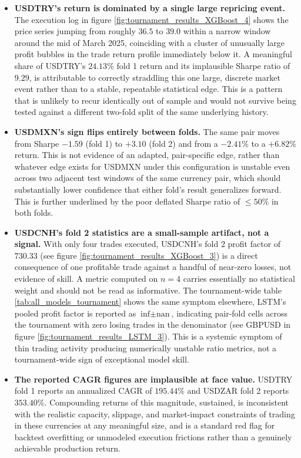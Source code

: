 \documentclass[12pt, a4paper]{article}
\begin{document}
\begin{itemize}
\item \textbf{USDTRY's return is dominated by a single large repricing event.} The execution log in figure \ref{fig:tournament_results_XGBoost_4} shows the price 
series jumping from roughly $36.5$ to $39.0$ within a narrow window around the mid of March 2025, coinciding with a cluster of unusually large profit bubbles in the trade return 
profile immediately below it. A meaningful share of USDTRY's $24.13\%$ fold 1 return and its implausible Sharpe ratio of $9.29$, is attributable to correctly 
straddling this one large, discrete market event rather than to a stable, repeatable statistical edge. This is a pattern that is unlikely to recur identically out of 
sample and would not survive being tested against a different two-fold split of the same underlying history.

\item \textbf{USDMXN's sign flips entirely between folds.} The same pair moves from Sharpe $-1.59$ (fold 1) to $+3.10$ (fold 2) and from a $-2.41\%$ to a $+6.82\%$ return. This 
is not evidence of an adapted, pair-specific edge, rather than whatever edge exists for USDMXN under this configuration is unstable even across two adjacent test 
windows of the same currency pair, which should substantially lower confidence that either fold's result generalizes forward. This is further underlined by the poor deflated Sharpe 
ratio of $\leq 50\%$ in both folds.

\item \textbf{USDCNH's fold 2 statistics are a small-sample artifact, not a signal.} With only four trades executed, USDCNH's fold 2 profit factor of $730.33$ (see figure 
\ref{fig:tournament_results_XGBoost_3}) is a direct consequence of one profitable trade against a handful of near-zero losses, not evidence of skill. A metric computed on $n=4$ 
carries essentially no statistical weight and should not be read as informative. The tournament-wide table \ref{tab:all_models_tournament} shows the same symptom elsewhere, LSTM's 
pooled profit factor is reported as $\text{inf} \pm \text{nan}$, indicating pair-fold cells across the tournament with zero losing trades in the denominator (see GBPUSD in figure 
\ref{fig:tournament_results_LSTM_3}). This is a systemic symptom of thin trading activity producing numerically unstable ratio metrics, not a tournament-wide sign of exceptional 
model skill.

\item \textbf{The reported CAGR figures are implausible at face value.} USDTRY fold 1 reports an annualized CAGR of $195.44\%$ and USDZAR fold 2 reports $353.40\%$. Compounding 
returns of this magnitude, sustained, is inconsistent with the realistic capacity, slippage, and market-impact constraints of trading in these currencies at any meaningful size, 
and is a standard red flag for backtest overfitting or unmodeled execution frictions rather than a genuinely achievable production return.


\end{itemize}
\end{document}
